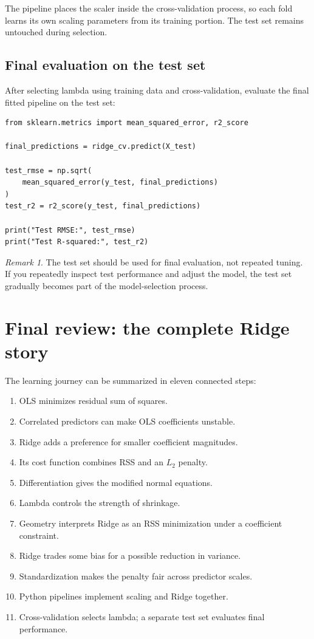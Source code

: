 \documentclass[11pt,a4paper]{article}
\numberwithin{equation}{section}
\theoremstyle{remark}
\newtheorem{remark}{Remark}[section]
\begin{document}
The pipeline places the scaler inside the cross-validation process, so
each fold learns its own scaling parameters from its training portion.
The test set remains untouched during selection.

\subsection{Final evaluation on the test set}
After selecting lambda using training data and cross-validation, evaluate
the final fitted pipeline on the test set:
\begin{lstlisting}
from sklearn.metrics import mean_squared_error, r2_score

final_predictions = ridge_cv.predict(X_test)

test_rmse = np.sqrt(
    mean_squared_error(y_test, final_predictions)
)
test_r2 = r2_score(y_test, final_predictions)

print("Test RMSE:", test_rmse)
print("Test R-squared:", test_r2)
\end{lstlisting}

\begin{remark}
The test set should be used for final evaluation, not repeated tuning.
If you repeatedly inspect test performance and adjust the model, the test
set gradually becomes part of the model-selection process.
\end{remark}

\section*{Final review: the complete Ridge story}

The learning journey can be summarized in eleven connected steps:
\begin{enumerate}
\item OLS minimizes residual sum of squares.
\item Correlated predictors can make OLS coefficients unstable.
\item Ridge adds a preference for smaller coefficient magnitudes.
\item Its cost function combines RSS and an $L_2$ penalty.
\item Differentiation gives the modified normal equations.
\item Lambda controls the strength of shrinkage.
\item Geometry interprets Ridge as an RSS minimization under a coefficient constraint.
\item Ridge trades some bias for a possible reduction in variance.
\item Standardization makes the penalty fair across predictor scales.
\item Python pipelines implement scaling and Ridge together.
\item Cross-validation selects lambda; a separate test set evaluates final performance.
\end{enumerate}
\end{document}
